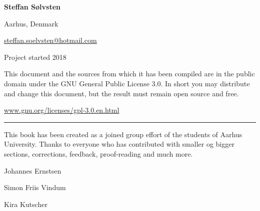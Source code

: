 \textbf{Steffan Sølvsten}

Aarhus, Denmark

\href{mailto:steffan.soelvsten@hotmail.com}{steffan.soelvsten@hotmail.com}

\vspace{1em}
\noindent Project started 2018

\vspace{1em}
\noindent This document and the sources from which it has been compiled are in
the public domain under the GNU General Public License 3.0. In short you may
distribute and change this document, but the result must remain open source and
free.

\begin{center}
  \href{https://www.gnu.org/licenses/gpl-3.0.en.html}{www.gnu.org/licenses/gpl-3.0.en.html}
\end{center}

\vspace{2em}
\noindent\hfil\rule{0.8\textwidth}{.4pt}\hfil

\vspace{2em}
\noindent This book has been created as a joined group effort of the students of Aarhus
University. Thanks to everyone who has contributed with smaller og bigger
sections, corrections, feedback, proof-reading and much more.

\begin{multicols}{2}
  Johannes Ernstsen

  Simon Friis Vindum
  
  \hfill
  \columnbreak
  
  Kira Kutscher
\end{multicols}
